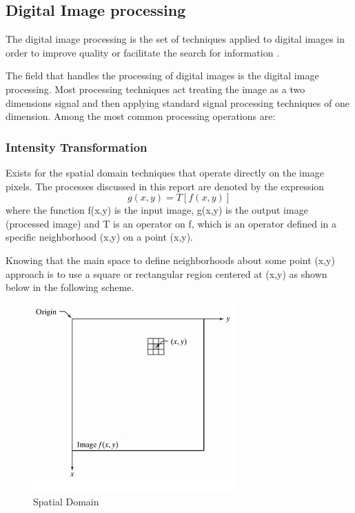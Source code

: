 \subsection{Digital Image processing}
The digital image processing is the set of techniques applied to digital images in order to improve quality or facilitate the search for information \cite{dip1}.

The field that handles the processing of digital images is the digital image processing. Most processing techniques act treating the image as a two dimensions signal and then applying standard signal processing techniques of one dimension. Among the most common processing operations are\cite{dip2}:
\subsubsection{Intensity Transformation}
Exists for the spatial domain techniques that operate directly on the image pixels. The processes discussed in this report are denoted by the expression
\begin{equation}
	 g(x,y) = T[f(x,y)]
\end{equation}
where the function f(x,y) is the input image, g(x,y) is the output image (processed image) and T is an operator on f, which is an operator defined in a specific neighborhood (x,y) on a point (x,y).

Knowing that the main space to define neighborhoods about some point (x,y) approach is to use a square or rectangular region centered at (x,y) as shown below in the following scheme.

\begin{figure}
	\centering
		\includegraphics[scale=1]{images/ch2/spatialDomain.jpg}
		\caption{Spatial Domain}
		\label{fig:spatialDomain}
\end{figure}


